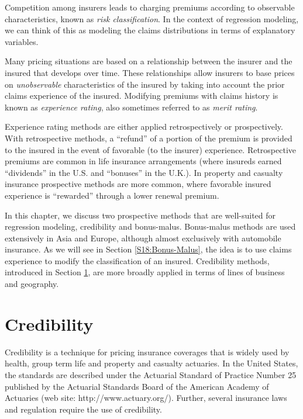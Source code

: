 Competition among insurers leads to charging premiums according to
observable characteristics, known as \textit{risk classification}.
In the context of regression modeling, we can think of this as
modeling the claims distributions in terms of explanatory variables.

Many pricing situations are based on a relationship between the
insurer and the insured that develops over time. These relationships
allow insurers to base prices on \emph{unobservable} characteristics
of the insured by taking into account the prior claims experience of
the insured. Modifying premiums with claims history is known as
\emph{experience rating}, also sometimes referred to as
\textit{merit rating}.

Experience rating methods are either applied retrospectively or
prospectively. With retrospective methods, a ``refund'' of a portion
of the premium is provided to the insured in the event of favorable
(to the insurer) experience. Retrospective premiums are common in
life insurance arrangements (where insureds earned ``dividends'' in
the U.S. and ``bonuses'' in the U.K.). In property and casualty
insurance prospective methods are more common, where favorable
insured experience is ``rewarded'' through a lower renewal premium.

In this chapter, we discuss two prospective methods that are
well-suited for regression modeling, credibility and bonus-malus.
Bonus-malus methods are used extensively in Asia and Europe,
although almost exclusively with automobile insurance. As we will
see in Section \ref{S18:Bonus-Malus}, the idea is to use claims
experience to modify the classification of an insured. Credibility
methods, introduced in Section \ref{S18:Cred}, are more broadly
applied in terms of lines of business and geography.


\section{Credibility}\label{S18:Cred}

Credibility is a technique for pricing insurance coverages that is
widely used by health, group term life and property and casualty
actuaries. In the United States, the standards are described under
the Actuarial Standard of Practice Number 25 published by the
Actuarial Standards Board of the American Academy of Actuaries (web
site: http://www.actuary.org/). Further, several insurance laws and
regulation require the use of credibility.

